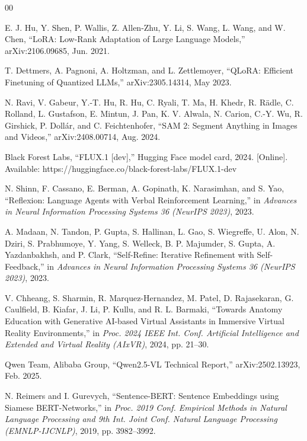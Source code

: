 \documentclass[conference]{IEEEtran}
\begin{document}
\begin{thebibliography}{00}

 E. J. Hu, Y. Shen, P. Wallis, Z. Allen-Zhu, Y. Li, S. Wang, L. Wang, and W. Chen, ``LoRA: Low-Rank Adaptation of Large Language Models,'' arXiv:2106.09685, Jun. 2021.

 T. Dettmers, A. Pagnoni, A. Holtzman, and L. Zettlemoyer, ``QLoRA: Efficient Finetuning of Quantized LLMs,'' arXiv:2305.14314, May 2023.

 N. Ravi, V. Gabeur, Y.-T. Hu, R. Hu, C. Ryali, T. Ma, H. Khedr, R. R\"adle, C. Rolland, L. Gustafson, E. Mintun, J. Pan, K. V. Alwala, N. Carion, C.-Y. Wu, R. Girshick, P. Doll\'ar, and C. Feichtenhofer, ``SAM 2: Segment Anything in Images and Videos,'' arXiv:2408.00714, Aug. 2024.

 Black Forest Labs, ``FLUX.1 [dev],'' Hugging Face model card, 2024. [Online]. Available: https://huggingface.co/black-forest-labs/FLUX.1-dev

 N. Shinn, F. Cassano, E. Berman, A. Gopinath, K. Narasimhan, and S. Yao, ``Reflexion: Language Agents with Verbal Reinforcement Learning,'' in \emph{Advances in Neural Information Processing Systems 36 (NeurIPS 2023)}, 2023.

 A. Madaan, N. Tandon, P. Gupta, S. Hallinan, L. Gao, S. Wiegreffe, U. Alon, N. Dziri, S. Prabhumoye, Y. Yang, S. Welleck, B. P. Majumder, S. Gupta, A. Yazdanbakhsh, and P. Clark, ``Self-Refine: Iterative Refinement with Self-Feedback,'' in \emph{Advances in Neural Information Processing Systems 36 (NeurIPS 2023)}, 2023.

 V. Chheang, S. Sharmin, R. Marquez-Hernandez, M. Patel, D. Rajasekaran, G. Caulfield, B. Kiafar, J. Li, P. Kullu, and R. L. Barmaki, ``Towards Anatomy Education with Generative AI-based Virtual Assistants in Immersive Virtual Reality Environments,'' in \emph{Proc. 2024 IEEE Int. Conf. Artificial Intelligence and Extended and Virtual Reality (AIxVR)}, 2024, pp. 21--30.

 Qwen Team, Alibaba Group, ``Qwen2.5-VL Technical Report,'' arXiv:2502.13923, Feb. 2025.

 N. Reimers and I. Gurevych, ``Sentence-BERT: Sentence Embeddings using Siamese BERT-Networks,'' in \emph{Proc. 2019 Conf. Empirical Methods in Natural Language Processing and 9th Int. Joint Conf. Natural Language Processing (EMNLP-IJCNLP)}, 2019, pp. 3982--3992.


\end{thebibliography}
\end{document}
